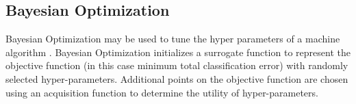 \documentclass[numbered,pdftex]{ohio-etd}
\begin{document}
{{		
%
%		
%

		
		
		
	} %

	\subsection{Bayesian Optimization}\label{Bayesian_Optimization}{
		
		{Bayesian Optimization may be used to tune the hyper parameters of a machine algorithm \cite{noauthor_bayesian_nodate, snoek_practical_2012}. Bayesian Optimization initializes a surrogate function to represent the objective function (in this case minimum total classification error) with randomly selected hyper-parameters. Additional points on the objective function are chosen using an acquisition function to determine the utility of hyper-parameters.}
		
}}
\end{document}
